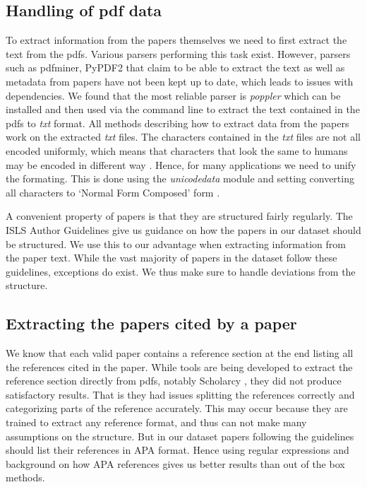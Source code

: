 \documentclass[journal,twocolumn]{IEEEtran}
\begin{document}
    \hypertarget{handling-of-pdf-data}{%
\subsection{Handling of pdf data}\label{handling-of-pdf-data}}

To extract information from the papers themselves we need to first
extract the text from the pdfs. Various parsers performing this task
exist. However, parsers such as pdfminer, PyPDF2 that claim to be able
to extract the text as well as metadata from papers have not been kept
up to date, which leads to issues with dependencies. We found that the
most reliable parser is \emph{poppler} \cite{poppler} which can be
installed and then used via the command line to extract the text
contained in the pdfs to \emph{txt} format. All methods describing how
to extract data from the papers work on the extracted \emph{txt} files.
The characters contained in the \emph{txt} files are not all encoded
uniformly, which means that characters that look the same to humans may
be encoded in different way . Hence, for many applications we need to
unify the formating. This is done using the \emph{unicodedata} module
and setting converting all characters to `Normal Form Composed' form .

A convenient property of papers is that they are structured fairly
regularly. The ISLS Author Guidelines \cite{guidelines} give us guidance
on how the papers in our dataset should be structured. We use this to
our advantage when extracting information from the paper text. While the
vast majority of papers in the dataset follow these guidelines,
exceptions do exist. We thus make sure to handle deviations from the
structure.

\hypertarget{extracting-the-papers-cited-by-a-paper}{%
\subsection{Extracting the papers cited by a
paper}\label{extracting-the-papers-cited-by-a-paper}}

We know that each valid paper contains a reference section at the end
listing all the references cited in the paper. While tools are being
developed to extract the reference section directly from pdfs, notably
Scholarcy \cite{scholarcy}, they did not produce satisfactory results.
That is they had issues splitting the references correctly and
categorizing parts of the reference accurately. This may occur because
they are trained to extract any reference format, and thus can not make
many assumptions on the structure. But in our dataset papers following
the guidelines should list their references in APA format. Hence using
regular expressions and background on how APA references gives us better
results than out of the box methods.
\end{document}
